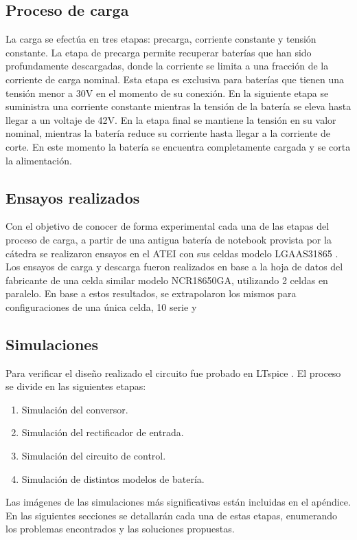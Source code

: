 \subsection{Proceso de carga}
La carga se efectúa en tres etapas: precarga, corriente constante y tensión constante. 
La etapa de precarga permite recuperar baterías que han sido profundamente descargadas, donde la
corriente se limita a una fracción de la corriente de carga nominal. 
Esta etapa es exclusiva para baterías que tienen una tensión menor a 30V en el momento de su conexión. 
En la siguiente etapa se suministra una corriente constante mientras la tensión de la batería se eleva hasta
llegar a un voltaje de 42V. En la etapa final se mantiene la tensión en su valor nominal, mientras
la batería reduce su corriente hasta llegar a la corriente de corte. En este momento la batería se
encuentra completamente cargada y se corta la alimentación.

\subsection{Ensayos realizados}
Con el objetivo de conocer de forma experimental cada una de las etapas del proceso de carga,
a partir de una antigua batería de notebook provista por la cátedra
se realizaron ensayos en el ATEI con sus celdas modelo LGAAS31865 \cite{icr18650s3}.
Los ensayos de carga y descarga fueron realizados en base a la hoja de datos
del fabricante de una celda similar modelo NCR18650GA, utilizando 2 celdas en paralelo. 
En base a estos resultados, se extrapolaron los mismos para configuraciones de una única celda,
10 serie y 

\subsection{Simulaciones}
Para verificar el diseño realizado el circuito fue probado en LTspice \cite{ltspice}.
El proceso se divide en las siguientes etapas:
\begin{enumerate}
    \item Simulación del conversor.
    \item Simulación del rectificador de entrada.
    \item Simulación del circuito de control.
    \item Simulación de distintos modelos de batería.
\end{enumerate}
Las imágenes de las simulaciones más significativas están incluidas en el apéndice.
En las siguientes secciones se detallarán cada una de estas etapas,
enumerando los problemas encontrados y las soluciones propuestas.

